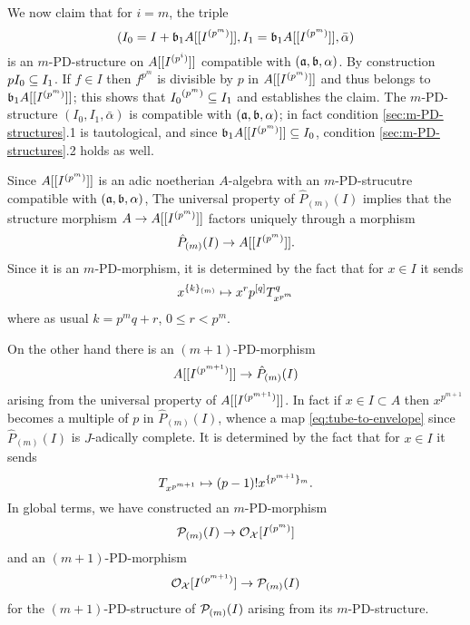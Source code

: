 \documentclass{article}
\theoremstyle{change}
\numberwithin{equation}{subsubsection}
\begin{document}
We now claim that for $i=m$, the triple
\begin{displaymath}
  (I_0=I+{\mathfrak b}_1 A[[{I}^{({p^m})}]], I_1={\mathfrak b}_1 A[[{I}^{({p^m})}]],\bar\alpha)
\end{displaymath}
is an $m$-PD-structure on $A[[{I}^{({p^i})}]]$ compatible with
$({\mathfrak a},{\mathfrak b},\alpha)$. By construction $pI_0\subseteq I_1$. If
$f\in I$ then $f^{p^m}$ is divisible by $p$ in $A[[{I}^{({p^m})}]]$ and
thus belongs to ${\mathfrak b}_1 A[[{I}^{({p^m})}]]$; this shows that
${I_0}^{({p^m})}\subseteq I_1$ and establishes the claim. The
$m$-PD-structure $(I_0,I_1,\bar\alpha)$ is compatible with
$({\mathfrak a},{\mathfrak b},\alpha)$; in fact condition \ref{sec:m-PD-structures}.1 is
tautological, and since ${\mathfrak b}_1A[[{I}^{({p^m})}]]\subseteq I_0$, condition
\ref{sec:m-PD-structures}.2 holds as well.

Since $A[[{I}^{({p^m})}]]$ is an adic noetherian $A$-algebra with an
$m$-PD-strucutre compatible with $({\mathfrak a},{\mathfrak b},\alpha)$, The universal
property of $\hat P_{(m)}(I)$ implies that the structure morphism
$A\to A[[{I}^{({p^m})}]]$ factors uniquely through a morphism
\begin{equation}
  \label{eq:envelope-to-tube}
  \hat P_{(m)}(I)\to A[[{I}^{({p^m})}]].
\end{equation}
Since it is an $m$-PD-morphism, it is determined by the fact that for
$x\in I$ it sends
\begin{equation}
  \label{eq:envelope-to-tube-explicit}
  {x}^{\{{k}\}_{(m)}}\mapsto x^r{p}^{[{q}]}T^q_{x^{p^m}}
\end{equation}
where as usual $k=p^mq+r$, $0\le r<p^m$.

On the other hand there is an $(m+1)$-PD-morphism
\begin{equation}
  \label{eq:tube-to-envelope}
  A[[{I}^{({p^{m+1}})}]]\to\hat P_{(m)}(I)
\end{equation}
arising from the universal property of $A[[{I}^{({p^{m+1}})}]]$. In fact
if $x\in I\subset A$ then $x^{p^{m+1}}$ becomes a multiple of $p$ in
$\hat P_{(m)}(I)$, whence a map \ref{eq:tube-to-envelope} since
$\hat P_{(m)}(I)$ is $J$-adically complete. It is determined by the
fact that for $x\in I$ it sends
\begin{equation}
  \label{eq:tube-to-envelope-explicit}
  T_{x^{p^{m+1}}}\mapsto (p-1)!{x}^{\{{p^{m+1}}\}_{m}}.  
\end{equation}
In global terms, we have constructed an $m$-PD-morphism
\begin{equation}\label{eq:envelope-to-tube-global}
  {\cal P}_{(m)}(I)\to{\cal O}_{\cal X}[{I}^{({p^m})}]
\end{equation}
and an $(m+1)$-PD-morphism
\begin{equation}\label{eq:tube-to-envelope-global}
  {\cal O}_{\cal X}[{I}^{({p^{m+1}})}]\to{\cal P}_{(m)}(I)
\end{equation}
for the $(m+1)$-PD-structure of ${\cal P}_{(m)}(I)$ arising from its
$m$-PD-structure.
\end{document}
